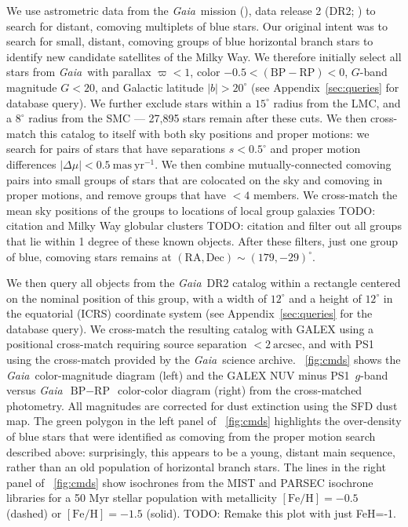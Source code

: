 \documentclass[modern]{aastex62}
\newcommand{\acronym}[1]{{\small{#1}}}
\newcommand{\gaia}{\textsl{Gaia}}
\newcommand{\pans}{\acronym{PS1}}
\newcommand{\DR}[1]{\acronym{DR#1}}
\newcommand{\todo}[1]{{\color{red} TODO: #1}}
\newcommand{\masyr}{\ensuremath{\textrm{mas}~\textrm{yr}^{-1}}}
\newcommand{\feh}{\ensuremath{[\textrm{Fe} / \textrm{H}]}}
\newcommand{\bprp}{\ensuremath{\textrm{BP} - \textrm{RP}}}
\begin{document}
We use astrometric data from the \gaia\ mission (\citealt{Prusti:2016}), data release 2 (\DR{2}; \citealt{Gaia-Collaboration:2018, Lindegren:2018}) to search for distant, comoving multiplets of blue stars.
Our original intent was to search for small, distant, comoving groups of blue horizontal branch stars to identify new candidate satellites of the Milky Way.
We therefore initially select all stars from \gaia\ with parallax $\varpi < 1$, color $-0.5 < (\bprp) < 0$, $G$-band magnitude $G < 20$, and Galactic latitude $|b| > 20^\circ$ (see Appendix~\ref{sec:queries} for database query).
We further exclude stars within a $15^\circ$ radius from the LMC, and a $8^\circ$ radius from the SMC --- 27,895 stars remain after these cuts.
We then cross-match this catalog to itself with both sky positions and proper motions: we search for pairs of stars that have separations $s < 0.5^\circ$ and proper motion differences $|\Delta \mu| < 0.5~\masyr$.
We then combine mutually-connected comoving pairs into small groups of stars that are colocated on the sky and comoving in proper motions, and remove groups that have $<4$ members.
We cross-match the mean sky positions of the groups to locations of local group galaxies \todo{citation} \citep{Mcconaghie} and Milky Way globular clusters \todo{citation} \citep{Harris} and filter out all groups that lie within 1 degree of these known objects.
After these filters, just one group of blue, comoving stars remains at $(\textrm{RA}, \textrm{Dec}) \sim (179, -29)^\circ$.

We then query all objects from the \gaia\ \DR{2} catalog within a rectangle centered on the nominal position of this group, with a width of $12^\circ$ and a height of $12^\circ$ in the equatorial (ICRS) coordinate system (see Appendix~\ref{sec:queries} for the database query).
We cross-match the resulting catalog with \acronym{GALEX} \citep{Martin:2005} using a positional cross-match requiring source separation $<2~\textrm{arcsec}$, and with \pans\ \citep{Chambers:2016} using the cross-match provided by the \gaia\ science archive.
\figurename~\ref{fig:cmds} shows the \gaia\ color-magnitude diagram (left) and the \acronym{GALEX} NUV minus \pans\ $g$-band versus \gaia\ \bprp\ color-color diagram (right) from the cross-matched photometry.
All magnitudes are corrected for dust extinction using the SFD \citep{Schlegel:1998, Sclafly:2011} dust map.
The green polygon in the left panel of \figurename~\ref{fig:cmds} highlights the over-density of blue stars that were identified as comoving from the proper motion search described above: surprisingly, this appears to be a young, distant main sequence, rather than an old population of horizontal branch stars.
The lines in the right panel of \figurename~\ref{fig:cmds} show isochrones from the \acronym{MIST} \citep[blue;][]{Choi:2016} and \acronym{PARSEC} \citep[red;][]{Bressan:2012, Marigo:2017} isochrone libraries for a 50 Myr stellar population with metallicity $\feh = -0.5$ (dashed) or $\feh = -1.5$ (solid). \todo{Remake this plot with just FeH=-1.}
\end{document}
